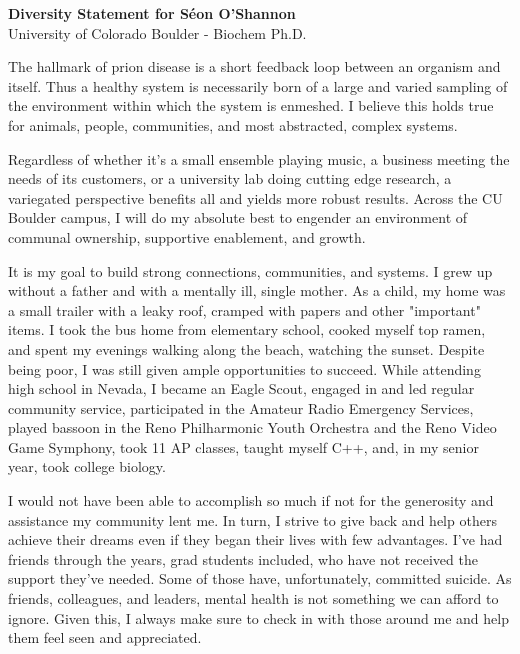 \documentclass[12pt]{article}
\begin{document}
\begin{center}
    \Large{\textbf{Diversity Statement for Séon O'Shannon}} \\
    University of Colorado Boulder - Biochem Ph.D.
\end{center}

\vspace{0.1cm}

The hallmark of prion disease is a short feedback loop between an organism and itself. Thus a healthy system is necessarily born of a large and varied sampling of the environment within which the system is enmeshed. I believe this holds true for animals, people, communities, and most abstracted, complex systems.

Regardless of whether it's a small ensemble playing music, a business meeting the needs of its customers, or a university lab doing cutting edge research, a variegated perspective benefits all and yields more robust results. Across the CU Boulder campus, I will do my absolute best to engender an environment of communal ownership, supportive enablement, and growth.

It is my goal to build strong connections, communities, and systems. I grew up without a father and with a mentally ill, single mother. As a child, my home was a small trailer with a leaky roof, cramped with papers and other "important" items. I took the bus home from elementary school, cooked myself top ramen, and spent my evenings walking along the beach, watching the sunset. Despite being poor, I was still given ample opportunities to succeed. While attending high school in Nevada, I became an Eagle Scout, engaged in and led regular community service, participated in the Amateur Radio Emergency Services, played bassoon in the Reno Philharmonic Youth Orchestra and the Reno Video Game Symphony, took 11 AP classes, taught myself C++, and, in my senior year, took college biology.

I would not have been able to accomplish so much if not for the generosity and assistance my community lent me. In turn, I strive to give back and help others achieve their dreams even if they began their lives with few advantages. I've had friends through the years, grad students included, who have not received the support they've needed. Some of those have, unfortunately, committed suicide. As friends, colleagues, and leaders, mental health is not something we can afford to ignore. Given this, I always make sure to check in with those around me and help them feel seen and appreciated.
\end{document}
